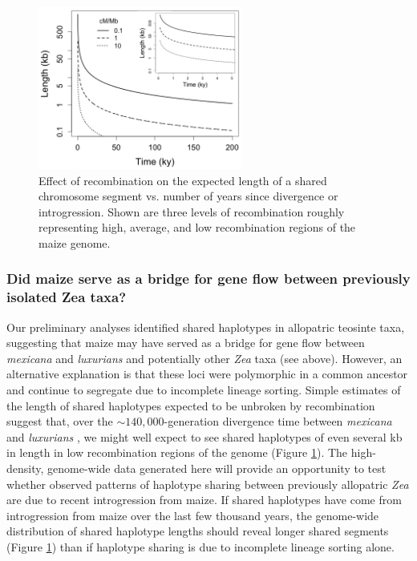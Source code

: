 \begin{figure}
  \centering
   \includegraphics[width=0.6\textwidth]{length_vs_time2}
    \caption{Effect of recombination on the expected length of a shared chromosome segment vs. number of years since divergence or introgression.  Shown are three levels of recombination roughly representing high, average, and low recombination regions of the maize genome.} 
\label{fig:length}
\end{figure}

\subsubsection{Did maize serve as a bridge for gene flow between previously isolated Zea taxa?}
\label{sss:bridge}

Our preliminary analyses identified shared haplotypes in allopatric teosinte taxa, suggesting that maize may have served as a bridge for gene flow between \emph{mexicana} and \emph{luxurians} and potentially other \emph{Zea} taxa (see above).  However, an alternative explanation is that these loci were polymorphic in a common ancestor and continue to segregate due to incomplete lineage sorting.
Simple estimates of the length of shared haplotypes expected to be unbroken by recombination suggest that, over the $\sim 140,000$-generation divergence time between \emph{mexicana} and \emph{luxurians} \citep{Ross-Ibarra2009a}, we might well expect to see shared haplotypes of even several kb in length in low recombination regions of the genome (Figure \ref{fig:length}).
The high-density, genome-wide data generated here will provide an opportunity to test whether observed patterns of haplotype sharing between previously allopatric \emph{Zea} are due to recent introgression from maize.  
If shared haplotypes have come from introgression from maize over the last few thousand years, the genome-wide distribution of shared haplotype lengths should reveal longer shared segments (Figure \ref{fig:length}) than if haplotype sharing is due to incomplete lineage sorting alone.

